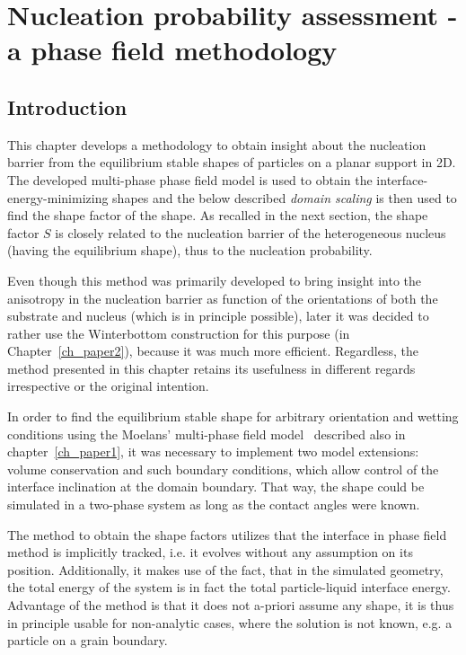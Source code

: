 \chapter{Nucleation probability assessment - a phase field methodology}\label{ch_NPA_PF_methodology}

\section{Introduction}
This chapter develops a methodology to obtain insight about the nucleation barrier from the equilibrium stable shapes of particles on a planar support in 2D. The developed multi-phase phase field model is used to obtain the interface-energy-minimizing shapes and the below described \textit{domain scaling} is then used to find the shape factor of the shape. As recalled in the next section, the shape factor $S$ is closely related to the nucleation barrier of the heterogeneous nucleus (having the equilibrium shape), thus to the nucleation probability. 

Even though this method was primarily developed to bring insight into the anisotropy in the nucleation barrier as function of the orientations of both the substrate and nucleus (which is in principle possible), later it was decided to rather use the Winterbottom construction for this purpose (in Chapter~\ref{ch_paper2}), because it was much more efficient. Regardless, the method presented in this chapter retains its usefulness in different regards irrespective or the original intention. 

In order to find the equilibrium stable shape for arbitrary orientation and wetting conditions using the Moelans' multi-phase field model~\cite{Moelans2008} described also in chapter~\ref{ch_paper1}, it was necessary to implement two model extensions: volume conservation and such boundary conditions, which allow control of the interface inclination at the domain boundary. That way, the shape could be simulated in a two-phase system as long as the contact angles were known.


The method to obtain the shape factors utilizes that the interface in phase field method is implicitly tracked, i.e. it evolves without any assumption on its position. Additionally, it makes use of the fact, that in the simulated geometry, the total energy of the system is in fact the total particle-liquid interface energy. Advantage of the method is that it does not a-priori assume any shape, it is thus in principle usable for non-analytic cases, where the solution is not known, e.g. a particle on a grain boundary.

